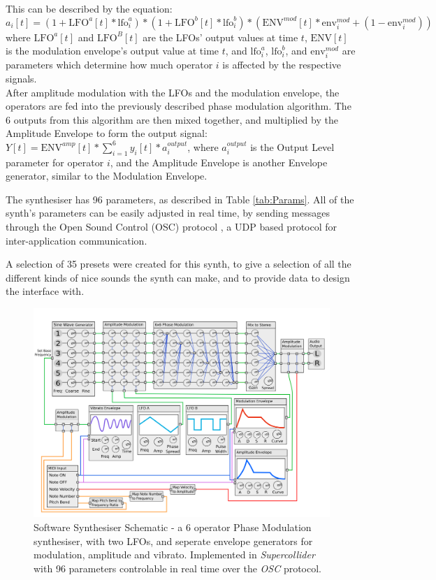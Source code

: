 \documentclass[11pt, oneside]{report}   	%
\begin{document}
This can be described by the equation:
 \begin{equation}
 	a_i[t] = (1 + \mathrm{LFO}^a[t]*\mathrm{lfo}^{a}_i)*(1 + \mathrm{LFO}^b[t]*\mathrm{lfo}^{b}_i)*(\mathrm{ENV}^{mod}[t]*\mathrm{env}^{mod}_i + (1-\mathrm{env}^{mod}_i))
 \end{equation}
where $\mathrm{LFO}^a[t]$ and $\mathrm{LFO}^B[t]$ are the LFOs' output values at time $t$, $\mathrm{ENV}[t]$ is the modulation envelope's output value at time $t$, and $\mathrm{lfo}^{a}_i$, $\mathrm{lfo}^{b}_i$, and $\mathrm{env}^{mod}_{i}$ are parameters which determine how much operator $i$ is affected by the respective signals.\\
After amplitude modulation with the LFOs and the modulation envelope, the operators are fed into the previously described phase modulation algorithm. The 6 outputs from this algorithm are then mixed together, and multiplied by the Amplitude Envelope to form the output signal: $Y[t] = \mathrm{ENV}^{amp}[t]*\sum_{i=1}^{6}y_i[t]*a_i^{output}$, where $a_i^{output}$ is the Output Level parameter for operator $i$, and the Amplitude Envelope is another Envelope generator, similar to the Modulation Envelope.

The synthesiser has 96 parameters, as described in Table \ref{tab:Params}. All of the synth's parameters can be easily adjusted in real time, by sending messages through the Open Sound Control (OSC) protocol \cite{OSC}, a UDP based protocol for inter-application communication.

A selection of 35 presets were created for this synth, to give a selection of all the different kinds of nice sounds the synth can make, and to provide data to design the interface with.
\begin{figure}[h] 
	\centering
	\hspace*{-1cm}
	\includegraphics[width = 7in]{SynthSchematic.png}
	\caption{Software Synthesiser Schematic - a 6 operator Phase Modulation synthesiser, with two LFOs, and seperate envelope generators for modulation, amplitude and vibrato. Implemented in \emph{Supercollider} with 96 parameters controlable in real time over the \emph{OSC} protocol.}\label{fig:SynthSchematic}
\end{figure}
\end{document}
